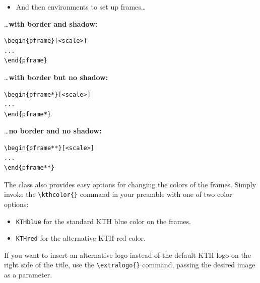\documentclass[portrait, a0]{KTHEEposter}
\begin{document}
\begin{pcolumns}[3]
\begin{pcolumn}[4]
\begin{pframe}[1.15]
\begin{itemize}
            
                    \item And then environments to set up frames\dots
                \end{itemize}
            \end{pframe}
            \begin{pframe}[.35] %
                \dots \textbf{with border and shadow:}
                \begin{lstlisting}
\begin{pframe}[<scale>]
...
\end{pframe}
                \end{lstlisting}
            \end{pframe}
            \begin{pframe*}[.35] %
                \dots \textbf{with border but no shadow:}
                \begin{lstlisting}
\begin{pframe*}[<scale>]
...
\end{pframe*}
                \end{lstlisting}
            \end{pframe*}
            \begin{pframe**}[.35] %
                \dots \textbf{no border and no shadow:}
                \begin{lstlisting}
\begin{pframe**}[<scale>]
...
\end{pframe**}
                \end{lstlisting}
            \end{pframe**}
        \end{pcolumn}%
        \begin{pcolumn}[3]
            \begin{pframe}[.7]
                The class also provides easy options for changing the colors of the frames.
                Simply invoke the \texttt{\textbackslash kthcolor\{\}} command in your preamble with one of two color options:
                \begin{itemize}
                    \item \texttt{KTHblue} for the standard KTH blue color on the frames.
                    \item \texttt{KTHred} for the alternative KTH red color.
                \end{itemize}
                \medskip
                If you want to insert an alternative logo instead of the default KTH logo on the right side of the title, use the \texttt{\textbackslash extralogo\{\}} command, passing the desired image as a parameter.

\end{pframe}
\end{pcolumn}
\end{pcolumns}
\end{document}
